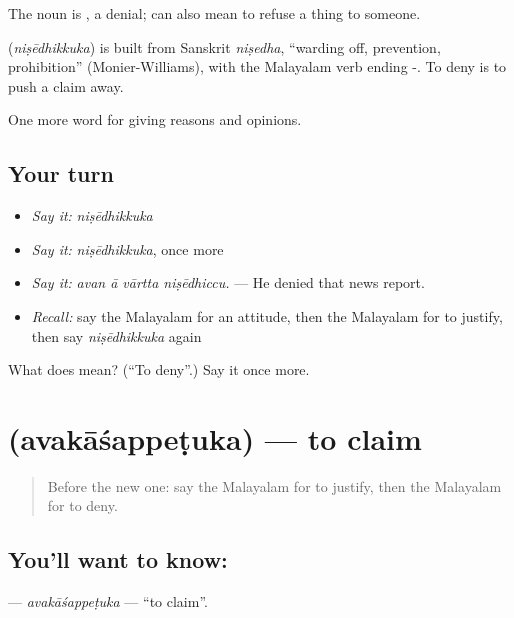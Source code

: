 The noun is , a denial;  can also mean to refuse a thing to someone.

\begin{cousinweb}
\textbf{} (\emph{niṣēdhikkuka}) is built from Sanskrit \emph{niṣedha}, \textquotedblleft{}warding off, prevention, prohibition\textquotedblright{} (Monier-Williams), with the Malayalam verb ending -. To deny is to push a claim away.
\end{cousinweb}

\begin{grammarlens}[title={What you've built}]
One more word for giving reasons and opinions.
\end{grammarlens}

\subsection*{Your turn}
\begin{itemize}
\raggedright
  \item \emph{Say it:} \emph{niṣēdhikkuka}
  \item \emph{Say it:} \emph{niṣēdhikkuka}, once more
  \item \emph{Say it:} \emph{avan ā vārtta niṣēdhiccu.} — He denied that news report.
  \item \emph{Recall:} say the Malayalam for an attitude, then the Malayalam for to justify, then say \emph{niṣēdhikkuka} again
\end{itemize}

\begin{tcolorbox}[breakable,colback=teal!4,colframe=teal!35!black,title={Before you move on}]
What does  mean? (\textquotedblleft{}To deny\textquotedblright{}.) Say it once more.
\end{tcolorbox}
\section[\texorpdfstring{\ml{അവകാശപ്പെടുക} (avakāśappeṭuka)}{അവകാശപ്പെടുക (avakāśappeṭuka)}]{ (avakāśappeṭuka) — to claim}

\label{lesson:ML-C409-avakasappetuka}



\begin{quote}
Before the new one: say the Malayalam for to justify, then the Malayalam for to deny.
\end{quote}

\subsection*{You'll want to know: }
\textbf{} — \emph{avakāśappeṭuka} — \textquotedblleft{}to claim\textquotedblright{}.

